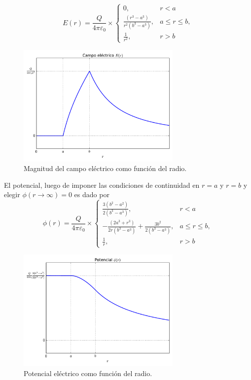 \begin{equation}
E(r)=\frac{Q}{4\pi\varepsilon_0}\times\left\{\begin{array}{cl}
0, & r<a\\
\frac{(r^3-a^3)}{r^2(b^3-a^3)}, & a\le r\le b,\\
\frac{1}{r^2}, & r>b
\end{array}\right.
\end{equation}
\begin{figure}[!h]
\centerline{\includegraphics[height=6cm]{fig/fig-esfera-hueca-campo.pdf}}
\caption{Magnitud del campo eléctrico como función del radio.}
\label{fig_ehc}
\end{figure}

El potencial, luego de imponer las condiciones de continuidad en $r=a$ y $r=b$ y elegir $\phi(r\to\infty)=0$ es dado por
\begin{equation}
\phi(r)=\frac{Q}{4\pi\varepsilon_0}\times\left\{\begin{array}{cl}
\frac{3(b^2-a^2)}{2(b^3-a^3)}, & r<a\\
-\frac{(2a^3+r^3)}{2r(b^3-a^3)}+\frac{3b^2}{2(b^3-a^3)}, & a\le r\le b,\\
\frac{1}{r}, & r>b
\end{array}\right.
\end{equation}
\begin{figure}[!h]
\centerline{\includegraphics[height=6cm]{fig/fig-esfera-hueca-potencial.pdf}}
\caption{Potencial eléctrico como función del radio.}
\label{fig_ehp}
\end{figure}

